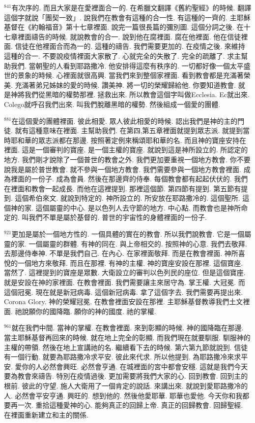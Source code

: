 \documentclass{book}
\begin{document}
$^{841}$有次序的.
而且大家是在愛裡面合一的.
在希臘文翻譯《舊約聖經》的時候.
翻譯這個字就說「團契一致」.
說我們在教會有這種的合一性.
有這種的一齊的.
主耶穌基督在《約翰福音》第十七章裡面.
說完一篇很長篇的彌別圖.
這個分詞之後.
在十七章裡面禱告的時候.
就說教會的合一.
說到他在腐裡面.
腐在他裡面.
他在信徒裡面.
信徒在他裡面合而為一的.
這種的禱告.
我們需要更加的.
在疫情之後.
來維持這種的合一.
不要說疫情裡面大家散了.
心就完全的失散了.
完全的疏離了.
求主幫助我們.
當朝聖的人看到耶路撒冷.
他安排得這麼有秩序的.
一切都好像一個太平盛世的景象的時候.
心裡面就很高興.
當我們來到整個家裡面.
看到教會都是充滿著榮美.
充滿著弟兄姊妹的愛的時候.
讚美神.
將一切的榮耀歸給他.
你要知道教會.
就是神將我們從黑暗的權勢那裡.
拯救出來.
所以教會這個字叫做Ecclesia.
Ec就出來.
Colego就呼召我們出來.
叫我們脫離黑暗的權勢.
然後組成一個愛的團體.

$^{881}$在這個愛的團體裡面.
彼此相愛.
眾人彼此相愛的時候.
認出我們是神的主的門徒.
就有這種意味在裡面.
主幫助我們.
在第四,第五章裡面就提到眾志派.
就提到當時耶和華的眾志派都在那邊.
按照著定例來稱頌耶和華的名.
而且神的寶座安持在裡面.
這是一個審判的寶座.
是一個主權的寶座.
就說到這是神所設立的.
所認定的地方.
我們剛才說除了一個普世的教會之外.
我們更加要重視一個地方教會.
你不要說我是屬於普世教會.
就不參與一個地方教會.
我們需要參與一個地方教會裡面.
成為裡面的一份子.
成為會員.
然後在那邊齊的侍奉.
每個教會都有起起伏伏的.
我們在裡面和教會一起成長.
而他在這裡提到.
那裡這個節.
第四節有提到.
第五節有提到.
這個希伯來文.
就說到特定的.
神所設立的.
所安放在耶路撒冷的.
這個聖所.
這個神的家.
這個屬靈的中心.
是以色列人去守節的地方.
中心點.
而教會也是神所命定的.
叫我們不單是屬於基督的.
普世的宇宙性的身體裡面的一份子.

$^{921}$更加是屬於一個地方性的.
一個具體的實在的教會.
所以我們說教會.
它是一個屬靈的家.
一個屬靈的群體.
有神的同在.
與上帝相交的.
按照神的心意.
我們去敬拜.
去那邊侍奉神.
不單是我們自己.
在內心.
在家裡面敬拜.
而是在教會裡面.
神所喜悅的一個地方來敬拜.
而且在那裡.
有神的主權.
神的寶座安設在那裡.
這個寶座.
當然了.
這裡提到的寶座是眾數.
大衛設立的審判以色列民的座位.
但是這個寶座.
就是安設在神的家裡面.
在教會裡面.
我們需要讓主來居守為.
掌王權.
大冠冕.
而這個冠冕.
現在就是新冠病毒.
這個新冠病毒.
拿了這個字去.
我們需要再提出來.
Corona Glory.
神的榮耀冠冕.
在教會裡面安設在那裡.
主耶穌基督教導我們土文裡面.
祂說願你的國降臨.
願你的神的國度.
祂的掌權.

$^{961}$就在我們中間.
當神的掌權.
在教會裡面.
來到彰顯的時候.
神的國降臨在那邊.
當主耶穌基督再回來的時候.
就在地上完全的彰顯.
而我們現在就要馴服.
馴服神的主權的帶領.
然後在地上宣講祂的名.
繼續看下去的時候.
第六第九節就說到.
信徒有一個行動.
就要為耶路撒冷求平安.
彼此來代求.
所以他提到.
為耶路撒冷來求平安.
愛你的人必然會興旺.
必然會亨通.
在城裡面的宮中都會安穩.
這就是我們今天要為教會來禱告.
特別在疫情過後.
更加需要將我們大家的心.
回到教會.
回到主的根前.
彼此的守望.
施人大衛用了一個肯定的說話.
來講出來.
就說到愛耶路撒冷的人.
必然會平安亨通.
興旺的.
想到他的.
然後他愛耶華.
耶華也愛他.
今天你和我都要再一次.
重拾這種愛神的心.
能夠真正的回歸上帝.
真正的回歸教會.
回歸聖經.
在裡面重新建立和主的關係.
\end{document}

